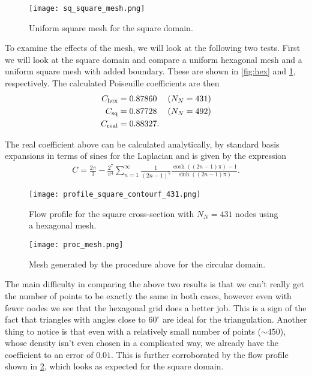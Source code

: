\documentclass[10pt,a4paper,twocolumn]{article}
\begin{document}
\begin{figure}[!h]
    \centering
    \texttt{[image: sq\_square\_mesh.png]}
    \caption{Uniform square mesh for the square domain.}
    \label{fig:sq_sq}
\end{figure}

To examine the effects of the mesh, we will look at the following two tests. First we will look at the square domain and compare a uniform hexagonal mesh and a uniform square mesh with added boundary. These are shown in \cref{fig:hex} and \cref{fig:sq_sq}, respectively. The calculated Poiseuille coefficients are then
%
\begin{align}
    C_{\mathrm{hex}} &= 0.87860 &(N_N = 431)&\notag\\
    C_{\mathrm{sq}} &= 0.87728 &(N_N = 492)&\notag\\
    C_{\mathrm{real}} &= 0.88327.
\end{align}

The real coefficient above can be calculated analytically, by standard basis expansions in terms of sines for the Laplacian and is given by the expression
%
\begin{align}
    C = \frac{2 \pi}{3} - \frac{2^7}{\pi^4} \sum_{n=1}^{\infty} \frac{1}{(2n-1)^5} \frac{\cosh((2n-1)\pi) - 1}{\sinh((2n-1)\pi)}.
\end{align}


\begin{figure}[!b]
    \centering
    \texttt{[image: profile\_square\_contourf\_431.png]}
    \caption{Flow profile for the square cross-section with $N_N = 431$ nodes using a hexagonal mesh.}
    \label{fig:flow_square}
\end{figure}

\begin{figure}[!t]
    \centering
    \texttt{[image: proc\_mesh.png]}
    \caption{Mesh generated by the procedure above for the circular domain.}
    \label{fig:proc_mesh}
\end{figure}

The main difficulty in comparing the above two results is that we can't really get the number of points to be exactly the same in both cases, however even with fewer nodes we see that the hexagonal grid does a better job. This is a sign of the fact that triangles with angles close to $60^{\circ}$ are ideal for the triangulation. Another thing to notice is that even with a relatively small number of points ($\sim 450$), whose density isn't even chosen in a complicated way, we already have the coefficient to an error of $0.01$. This is further corroborated by the flow profile shown in \cref{fig:flow_square}, which looks as expected for the square domain.
\end{document}
